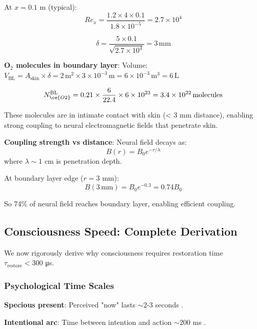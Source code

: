 \documentclass[11pt,onecolumn]{article}
\begin{document}
At $x = 0.1$ m (typical):
\begin{equation}
Re_x = \frac{1.2 \times 4 \times 0.1}{1.8 \times 10^{-5}} = 2.7 \times 10^4
\end{equation}

\begin{equation}
\delta = \frac{5 \times 0.1}{\sqrt{2.7 \times 10^4}} = 3\,\text{mm}
\end{equation}

\textbf{O$_2$ molecules in boundary layer}:
Volume: $V_{\text{BL}} = A_{\text{skin}} \times \delta = 2\,\text{m}^2 \times 3 \times 10^{-3}\,\text{m} = 6 \times 10^{-3}\,\text{m}^3 = 6\,\text{L}$

\begin{equation}
N_{\ce{O2}}^{\text{BL}} = 0.21 \times \frac{6}{22.4} \times 6 \times 10^{23} = 3.4 \times 10^{22}\,\text{molecules}
\end{equation}

These molecules are in intimate contact with skin (< 3 mm distance), enabling strong coupling to neural electromagnetic fields that penetrate skin.

\textbf{Coupling strength vs distance}:
Neural field decays as:
\begin{equation}
B(r) = B_0 e^{-r/\lambda}
\end{equation}
where $\lambda \sim 1$ cm is penetration depth.

At boundary layer edge ($r = 3$ mm):
\begin{equation}
B(3\,\text{mm}) = B_0 e^{-0.3} = 0.74 B_0
\end{equation}

So 74\% of neural field reaches boundary layer, enabling efficient coupling.

\subsection{Consciousness Speed: Complete Derivation}

We now rigorously derive why consciousness requires restoration time $\tau_{\text{restore}} < 300$ μs.

\subsubsection{Psychological Time Scales}

\textbf{Specious present}: Perceived "now" lasts $\sim 2$-3 seconds \citep{james1890principles}.

\textbf{Intentional arc}: Time between intention and action $\sim 200$ ms \citep{libet1983time}.
\end{document}
